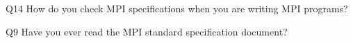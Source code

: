 \begin{description}%
\item{Q14} How do you check MPI specifications when you are writing MPI programs?%
\item{Q9} Have you ever read the MPI standard specification document?%
\end{description}%
